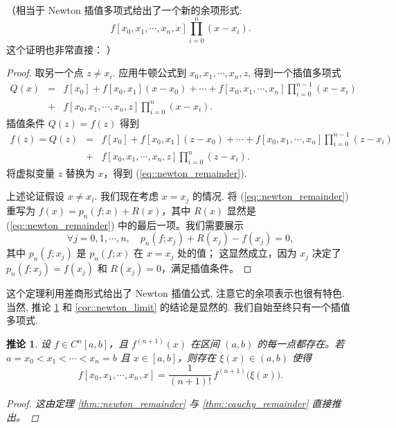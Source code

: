 \documentclass[a4paper]{ctexart}
\newtheorem{corollary}[theorem]{推论}
\numberwithin{theorem}{section}
\numberwithin{equation}{section}
\numberwithin{figure}{section}
\numberwithin{remark}{section}
\begin{document}
（相当于 Newton 插值多项式给出了一个新的余项形式:
\[
  f [x_0, x_1, \cdots , x_n , x] \prod_{i=0}^{n} (x - x_i ).
\]
这个证明也非常直接：
）

\begin{proof}
取另一个点 $z \neq x_i$. 
应用牛顿公式到 $x_0 , x_1 , \cdots , x_n , z$, 得到一个插值多项式
\begin{eqnarray*}
Q(x) &=& f [x_0] + f [x_0 , x_1](x - x_0) + \cdots + f [x_0 , x_1 , \cdots , x_n] 
\prod_{i=0}^{n-1} (x - x_i )\\
&+& f [x_0 , x_1 , \cdots , x_n , z] \prod_{i=0}^{n} (x - x_i ).
\end{eqnarray*}
插值条件 $Q(z) = f(z)$ 得到
\begin{eqnarray*}
f(z) = Q(z) &=& f [x_0 ] + f [x_0 , x_1 ](z - x_0) + \cdots + f [x_0 , x_1 , \cdots , x_n ] 
\prod_{i=0}^{n-1} (z - x_i )\\
&+& f [x_0 , x_1 , \cdots , x_n , z] \prod_{i=0}^{n} (z - x_i ).
\end{eqnarray*}
将虚拟变量 $z$ 替换为 $x$，得到 (\ref{eq::newton_remainder}).

上述论证假设 $x \neq x_i$. 我们现在考虑 $x = x_j$ 的情况. 将 (\ref{eq::newton_remainder}) 重写为 
$f(x) = p_n(f; x) + R(x)$，其中 $R(x)$ 显然是 (\ref{eq::newton_remainder}) 中的最后一项。我们需要展示
\[
\forall j = 0, 1, \cdots , n, \quad p_n(f ; x_j ) + R(x_j ) - f (x_j ) = 0,
\]
其中 $p_n (f ; x_j )$ 是 $p_n(f ; x)$ 在 $x = x_j$ 处的值；
这显然成立，因为 $x_j$ 决定了 $p_n(f ; x_j ) = f (x_j )$ 和 $R(x_j ) = 0$，满足插值条件。

\end{proof}

这个定理利用差商形式给出了 Newton 插值公式, 注意它的余项表示也很有特色. 
当然, 推论 \ref{cor::newton_remainder} 和 \ref{cor::newton_limit} 的结论是显然的. 我们自始至终只有一个插值多项式. 

\begin{corollary}
    \label{cor::newton_remainder}
设 $f\in C^{n}[a,b]$，且 $f^{(n+1)}(x)$ 在区间 $(a,b)$ 的每一点都存在。若 $a=x_0<x_1<\cdots<x_n=b$ 且 $x\in[a,b]$，则存在 $\xi(x)\in(a,b)$ 使得
\begin{equation}
f[x_0,x_1,\cdots,x_n,x]=\frac{1}{(n+1)!}\,f^{(n+1)}\bigl(\xi(x)\bigr).
\end{equation}
\begin{proof}
这由定理 \ref{thm::newton_remainder} 与 \ref{thm::cauchy_remainder} 直接推出。
\end{proof}
\end{corollary}
\end{document}
